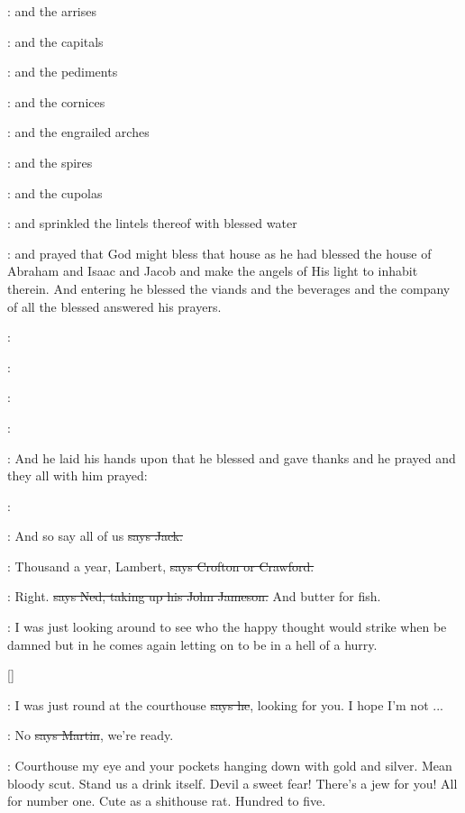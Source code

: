 :
and the arrises

:
and the capitals

:
and the pediments

:
and the cornices

:
and the engrailed arches

:
and the spires

:
and the cupolas

:
and sprinkled the lintels thereof with blessed water

:
and prayed that God might bless that house
as he had blessed the house of Abraham and Isaac and Jacob
and make the angels of His light to inhabit therein.
And entering
he blessed the viands
and the beverages
and the company of
all the blessed
answered his prayers.

:

:

:

:

:
And he laid his hands upon that he blessed
and gave thanks
and he prayed
and they all with him prayed:

\All:

\power:
And so say all of us
\sout{says Jack.}

\crofton:
Thousand a year,
Lambert,
\sout{says Crofton or Crawford.}

\lambert:
Right.
\sout{says Ned,
taking up his John Jameson.}
And butter for fish.

\Nq:
I was just looking around to see who the happy thought would strike
when be damned but in he comes again
letting on to be in a hell of a hurry.

[]

\Bloom:
I was just round at the courthouse
\sout{says he},
looking for you.
I hope I'm not ...

\cunningham:
No
\sout{says Martin},
we're ready.

\Nq:
Courthouse my eye and your pockets hanging down with gold and silver.
Mean bloody scut.
Stand us a drink itself.
Devil a sweet fear!
There's a jew for you!
All for number one.
Cute as a shithouse rat.
Hundred to five.

